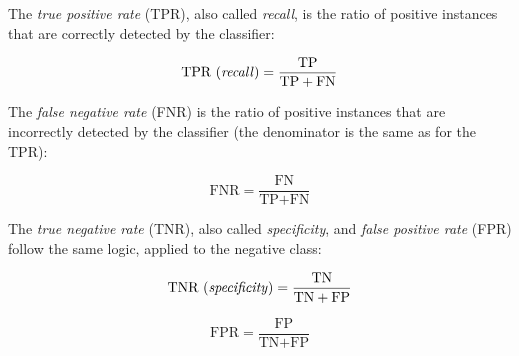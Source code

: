 The \textit{true positive rate} (TPR), also called \textit{recall}, is the ratio of positive instances that are correctly detected by the classifier:

\begin{equation}
    \text{TPR (\textit{recall})} = \frac{\text{TP}}{\text{TP}+\text{FN}}
\end{equation}


The \textit{false negative rate} (FNR) is the ratio of positive instances that are incorrectly detected by the classifier (the denominator is the same as for the TPR):

\begin{equation}
    \text{FNR} = \frac{\text{FN}}{\text{TP}+\text{FN}}
\end{equation}

The \textit{true negative rate} (TNR), also called \textit{specificity}, and \textit{false positive rate} (FPR) follow the same logic, applied to the negative class:

\begin{equation}
    \text{TNR (\textit{specificity})} = \frac{\text{TN}}{\text{TN}+\text{FP}}
\end{equation}

\begin{equation}
    \text{FPR} = \frac{\text{FP}}{\text{TN}+\text{FP}}
\end{equation}

